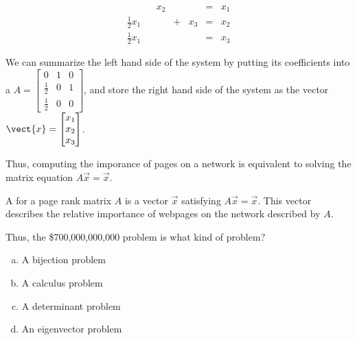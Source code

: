 \begin{applicationActivities}{5}{29}
\begin{example}
\begin{multicols}{2}
\begin{center}
  \end{center}
  \columnbreak
  \begin{alignat*}{4}
    && x_2 && &=& x_1 \\
  \frac{1}{2} x_1&& &+&x_3 &=& x_2 \\
  \frac{1}{2} x_1&& && &=& x_3
  \end{alignat*}

\end{multicols}

We can summarize the left hand side of the system by putting its coefficients
into a 
\(
  A
    =
  \begin{bmatrix}
    0 & 1 & 0 \\
    \frac{1}{2} & 0 & 1 \\
    \frac{1}{2} & 0 & 0
  \end{bmatrix}
\), and store the right hand side of the system as the vector
\(\vect{x}=\begin{bmatrix} x_1 \\ x_2 \\ x_3 \end{bmatrix}\).

Thus, computing the imporance of pages on a network is equivalent to solving
the matrix equation \(A\vec{x}=\vec{x}\).

\end{example}

\begin{activity}{5}
A  for a page rank matrix \(A\) is a vector $\vec{x}$
satisfying \(A\vec{x}=\vec{x}\). This vector describes the relative
importance of webpages on the network described by \(A\).

Thus, the \$700,000,000,000 problem is what kind of problem?
\begin{enumerate}[(a)]
\item A bijection problem
\item A calculus problem
\item A determinant problem
\item An eigenvector problem
\end{enumerate}
\end{activity}


\end{applicationActivities}
